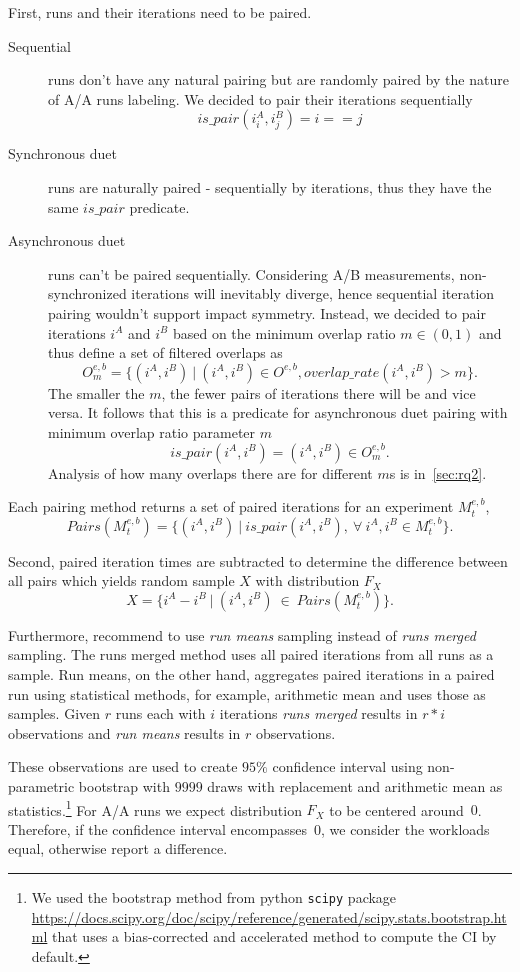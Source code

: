 First, runs and their iterations need to be paired.
\begin{description}
    \item[Sequential] runs don't have any natural pairing but are randomly paired by the nature of A/A runs labeling. We decided to pair their iterations sequentially
        $$
        is\_pair(i^A_i, i^B_j) = i == j
        $$
    \item[Synchronous duet] runs are naturally paired - sequentially by iterations, thus they have the same $is\_pair$ predicate.
    \item[Asynchronous duet] runs can't be paired sequentially.
        Considering A/B measurements, non-synchronized iterations will inevitably diverge, hence sequential iteration pairing wouldn't support impact symmetry.
        Instead, we decided to pair iterations $i^A$ and $i^B$ based on the minimum overlap ratio $m \in (0, 1)$ and thus define a set of filtered overlaps as
        $$
        O^{e,b}_m = \{(i^A, i^B)~|~(i^A, i^B) \in O^{e, b}, overlap\_rate(i^A, i^B) > m\}.
        $$
        The smaller the $m$, the fewer pairs of iterations there will be and vice versa.
        It follows that this is a predicate for asynchronous duet pairing with minimum overlap ratio parameter $m$
        $$
        is\_pair(i^A, i^B) = (i^A, i^B) \in O^{e,b}_m.
        $$
        Analysis of how many overlaps there are for different $m$s is in~\cref{sec:rq2}.
\end{description}
Each pairing method returns a set of paired iterations for an experiment $M^{e, b}_t$,
$$
Pairs(M^{e, b}_t) = \{(i^A, i^B)~|~is\_pair(i^A, i^B),~\forall~i^A, i^B \in M^{e, b}_t\}.
$$

Second, paired iteration times are subtracted to determine the difference between all pairs which yields random sample $X$ with distribution $F_X$
$$
X = \{i^A - i^B~|~(i^A, i^B)~\in~Pairs(M^{e, b}_t)\}.
$$

Furthermore, \citet{bulej2017stat} recommend to use \emph{run means} sampling instead of \emph{runs merged} sampling.
The runs merged method uses all paired iterations from all runs as a sample.
Run means, on the other hand, aggregates paired iterations in a paired run using statistical methods, for example, arithmetic mean and uses those as samples.
Given $r$ runs each with $i$ iterations \emph{runs merged} results in $r * i$ observations and \emph{run means} results in $r$ observations.

These observations are used to create $95\%$ confidence interval using non-parametric bootstrap with $9999$ draws with replacement and arithmetic mean as statistics.\footnote{We used the bootstrap method from python \lstinline{scipy} package \url{https://docs.scipy.org/doc/scipy/reference/generated/scipy.stats.bootstrap.html} that uses a \mbox{bias-corrected} and accelerated method to compute the CI by default.}
For A/A runs we expect distribution $F_X$ to be centered around~$0$.
Therefore, if the confidence interval encompasses~$0$, we consider the workloads equal, otherwise report a difference.
 

